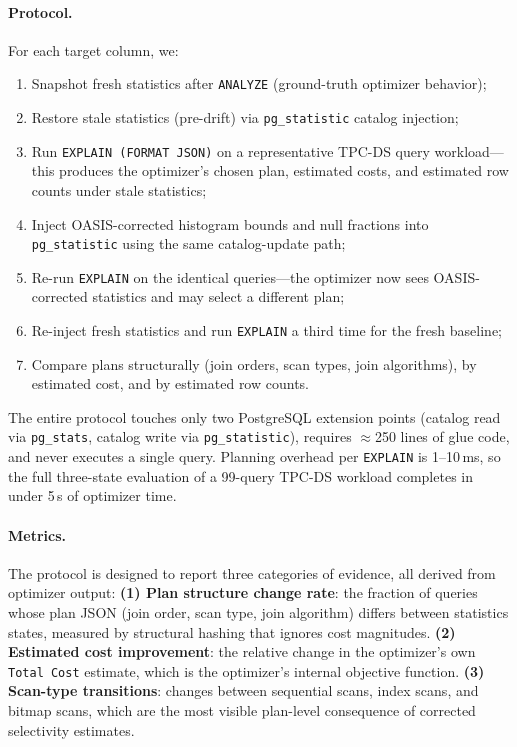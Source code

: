 \documentclass[runningheads]{llncs}
\begin{document}
\paragraph{Protocol.}
For each target column, we:
\begin{enumerate}[leftmargin=*]
  \item Snapshot fresh statistics after \texttt{ANALYZE} (ground-truth optimizer behavior);
  \item Restore stale statistics (pre-drift) via \texttt{pg\_statistic} catalog injection;
  \item Run \texttt{EXPLAIN (FORMAT JSON)} on a representative TPC-DS query workload---this
        produces the optimizer's chosen plan, estimated costs, and estimated row counts under
        stale statistics;
  \item Inject OASIS-corrected histogram bounds and null fractions into \texttt{pg\_statistic}
        using the same catalog-update path;
  \item Re-run \texttt{EXPLAIN} on the identical queries---the optimizer now sees OASIS-corrected
        statistics and may select a different plan;
  \item Re-inject fresh statistics and run \texttt{EXPLAIN} a third time for the fresh baseline;
  \item Compare plans structurally (join orders, scan types, join algorithms), by estimated cost,
        and by estimated row counts.
\end{enumerate}

The entire protocol touches only two PostgreSQL extension points
(catalog read via \texttt{pg\_stats}, catalog write via \texttt{pg\_statistic}), requires
$\approx$250 lines of glue code, and never executes a single query. Planning overhead per
\texttt{EXPLAIN} is 1--10\,ms, so the full three-state evaluation of a 99-query TPC-DS
workload completes in under 5\,s of optimizer time.

\paragraph{Metrics.}
The protocol is designed to report three categories of evidence, all derived from optimizer output:
\textbf{(1) Plan structure change rate}: the fraction of queries whose plan JSON (join order,
scan type, join algorithm) differs between statistics states, measured by structural hashing
that ignores cost magnitudes.
\textbf{(2) Estimated cost improvement}: the relative change in the optimizer's own
\texttt{Total Cost} estimate, which is the optimizer's internal objective function.
\textbf{(3) Scan-type transitions}: changes between sequential scans, index scans, and bitmap
scans, which are the most visible plan-level consequence of corrected selectivity estimates.
\end{document}
